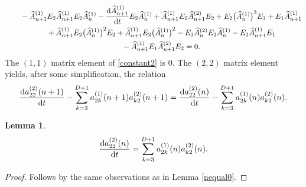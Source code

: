 \documentclass[pdftex]{sigma}
\numberwithin{equation}{section}
\newtheorem{Lemma}[Theorem]{Lemma}
\begin{document}
\begin{gather}
\qquad{}- \widehat{A}^{(1)}_{n+1} E_2 \widehat{A}^{(1)}_{n+1} E_2 \widehat{A}^{(1)}_n
 - \frac{{\rm d} \widehat{A}^{(1)}_{n+1}}{{\rm d}t} E_2 \widehat{A}^{(1)}_n + \widehat{A}^{(1)}_{n+1} E_2 \widehat{A}^{(2)}_{n+1} E_2
+ E_2 \big(\widehat{A}^{(1)}_n\big)^3 E_1 + E_1 \widehat{A}^{(1)}_{n+1} \nonumber\\
\qquad{}+ \widehat{A}^{(1)}_{n+1} E_2 \big(\widehat{A}^{(1)}_n\big)^2 E_2
+ \widehat{A}^{(1)}_{n+1} E_2 \big(\widehat{A}^{(1)}_n\big)^2
 -E_2 \widehat{A}^{(2)}_n E_2 \widehat{A}^{(1)}_n - E_1 \widehat{A}^{(1)}_{n+1} E_1 \nonumber\\
 \qquad{}- \widehat{A}^{(1)}_{n+1} E_1 \widehat{A}^{(2)}_{n+1} E_2 = 0.\label{constant2}
\end{gather}
The $(1,1)$ matrix element of \eqref{constant2} is $0$. The $(2,2)$ matrix element yields, after some simplification, the relation
\begin{align*}
\frac{{\rm d}a_{22}^{(2)}(n+1)}{{\rm d}t} - \sum_{k=3}^{D+1} a_{2k}^{(1)}(n+1)a_{k2}^{(2)}(n+1) = \frac{{\rm d} a_{22}^{(2)}(n)}{{\rm d}t} - \sum_{k=3}^{D+1} a_{2k}^{(1)}(n)a_{k2}^{(2)}(n).
\end{align*}
\begin{Lemma}
\begin{equation*}
\frac{{\rm d} a_{22}^{(2)}(n)}{{\rm d}t} = \sum_{k=3}^{D+1} a_{2k}^{(1)}(n)a_{k2}^{(2)}(n).
\end{equation*}
\end{Lemma}
\begin{proof}
Follows by the same observations as in Lemma \ref{nequal0}.
\end{proof}
\end{document}
